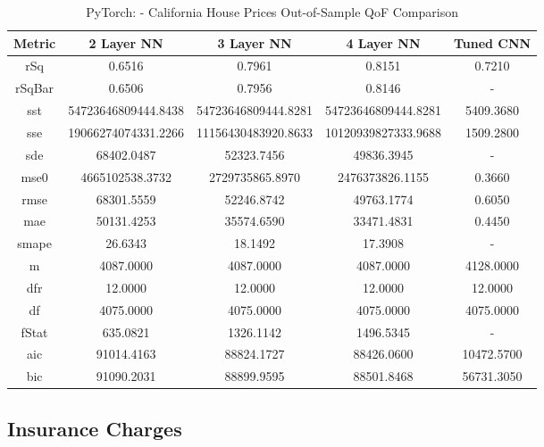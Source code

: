 \documentclass{article}
\begin{document}
\begin{table}[H]
\centering
\caption{PyTorch: - California House Prices Out-of-Sample QoF Comparison}
\label{tab:PyTorch: - California House Prices Out-of-Sample QoF Comparison}
\begin{tabular}{|c|c|c|c|c|} \hline
Metric & 2 Layer NN & 3 Layer NN & 4 Layer NN & Tuned CNN \\ \hline \hline
rSq & 0.6516 & 0.7961 & 0.8151 & 0.7210 \\ \hline
rSqBar & 0.6506 & 0.7956 & 0.8146 & - \\ \hline
sst & 54723646809444.8438 & 54723646809444.8281 & 54723646809444.8281 & 5409.3680 \\ \hline
sse & 19066274074331.2266 & 11156430483920.8633 & 10120939827333.9688 & 1509.2800 \\ \hline
sde & 68402.0487 & 52323.7456 & 49836.3945 & - \\ \hline
mse0 & 4665102538.3732 & 2729735865.8970 & 2476373826.1155 & 0.3660 \\ \hline
rmse & 68301.5559 & 52246.8742 & 49763.1774 & 0.6050 \\ \hline
mae & 50131.4253 & 35574.6590 & 33471.4831 & 0.4450 \\ \hline
smape & 26.6343 & 18.1492 & 17.3908 & - \\ \hline
m & 4087.0000 & 4087.0000 & 4087.0000 & 4128.0000 \\ \hline
dfr & 12.0000 & 12.0000 & 12.0000 & 12.0000 \\ \hline
df & 4075.0000 & 4075.0000 & 4075.0000 & 4075.0000 \\ \hline
fStat & 635.0821 & 1326.1142 & 1496.5345 & - \\ \hline
aic & 91014.4163 & 88824.1727 & 88426.0600 & 10472.5700 \\ \hline
bic & 91090.2031 & 88899.9595 & 88501.8468 & 56731.3050 \\ \hline
\end{tabular}
\end{table}

\subsection{Insurance Charges}
\end{document}
